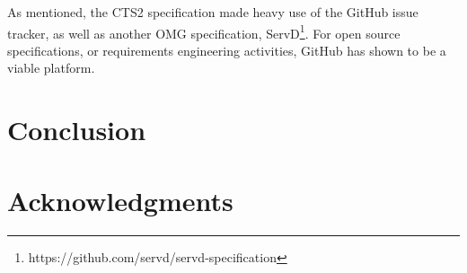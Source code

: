 \documentclass{proc}
\begin{document}
As mentioned, the CTS2 specification made heavy use of the GitHub issue tracker, as well as another OMG specification, ServD\footnote{https://github.com/servd/servd-specification}. For open source specifications, or requirements engineering activities, GitHub has shown to be a viable platform. 

\section{Conclusion}

\section{Acknowledgments}



\end{document}
